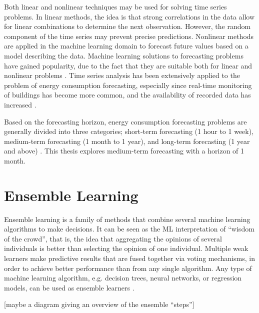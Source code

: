 Both linear and nonlinear techniques may be used for solving time series problems. In linear methods, the idea is that strong correlations in the data allow for linear combinations to determine the next observation. However, the random component of the time series may prevent precise predictions. Nonlinear methods are applied in the machine learning domain to forecast future values based on a model describing the data. Machine learning solutions to forecasting problems have gained popularity, due to the fact that they are suitable both for linear and nonlinear problems \cite{divina_stacking_2018}. Time series analysis has been extensively applied to the problem of energy consumption forecasting, especially since real-time monitoring of buildings has become more common, and the availability of recorded data has increased \cite{deb_review_2017}.

Based on the forecasting horizon, energy consumption forecasting problems are generally divided into three categories; short-term forecasting (1 hour to 1 week), medium-term forecasting (1 month to 1 year), and long-term forecasting (1 year and above) \cite{mat_daut_building_2017}. This thesis explores medium-term forecasting with a horizon of 1 month.

\section{Ensemble Learning}

Ensemble learning is a family of methods that combine several machine learning algorithms to make decisions. It can be seen as the ML interpretation of ``wisdom of the crowd'', that is, the idea that aggregating the opinions of several individuals is better than selecting the opinion of one individual. Multiple weak learners make predictive results that are fused together via voting mechanisms, in order to achieve better performance than from any single algorithm. Any type of machine learning algorithm, e.g. decision trees, neural networks, or regression models, can be used as ensemble learners \cite{sagi_ensemble_2018,dong_survey_2020}.

[maybe a diagram giving an overview of the ensemble ``steps'']

